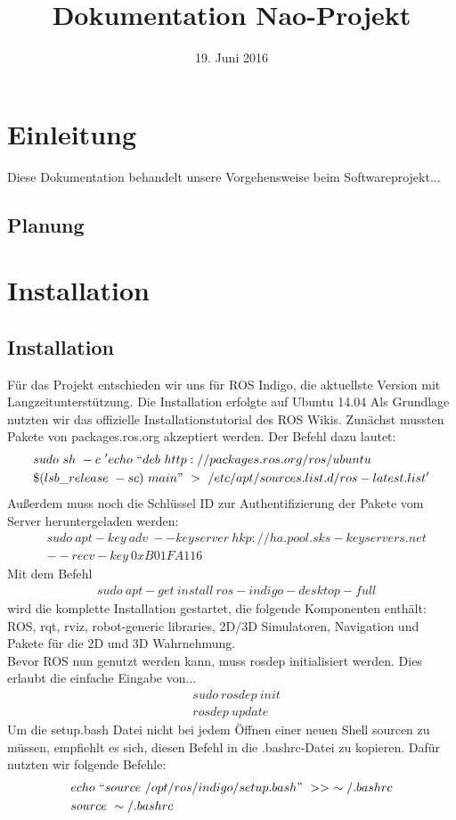 \documentclass{scrartcl}
\title{Dokumentation Nao-Projekt}
\date{19. Juni 2016}
\begin{document}
\maketitle
\tableofcontents
\newpage

\section{Einleitung}

Diese Dokumentation behandelt unsere Vorgehensweise beim Softwareprojekt...

\subsection{Planung}

\section{Installation}


\subsection{Installation}
Für das Projekt entschieden wir uns für ROS Indigo, die aktuellste Version mit Langzeitunterstützung.
Die Installation erfolgte auf Ubuntu 14.04 
Als Grundlage nutzten wir das offizielle Installationstutorial des ROS Wikis.
Zunächst mussten Pakete von packages.ros.org akzeptiert werden. Der Befehl dazu lautet: 
\begin{align}
&sudo\ sh\ -c\ 'echo\ ``deb\ http://packages.ros.org/ros/ubuntu \\ 
&\$(lsb\_release\ -sc)\ main"\ >\ /etc/apt/sources.list.d/ros-latest.list'
\end{align}
Außerdem muss noch die Schlüssel ID  zur Authentifizierung der Pakete vom Server heruntergeladen werden:
\begin{align}
&sudo\ apt-key\ adv\ --keyserver\ hkp://ha.pool.sks-keyservers.net\\ 
& --recv-key\ 0xB01FA116
\end{align}
Mit dem Befehl 
\begin{align}
&sudo\ apt-get\ install\ ros-indigo-desktop-full
\end{align}
wird die komplette Installation gestartet, die folgende Komponenten enthält: ROS, rqt, rviz, robot-generic libraries, 2D/3D Simulatoren, Navigation und Pakete für die 2D und 3D Wahrnehmung.
\\
Bevor ROS nun genutzt werden kann, muss rosdep initialisiert werden. Dies erlaubt die einfache Eingabe von...
\begin{align}
&sudo\ rosdep\ init\\
&rosdep\ update
\end{align}
Um die setup.bash Datei nicht bei jedem Öffnen einer neuen Shell sourcen zu müssen, empfiehlt es sich, diesen Befehl in die .bashrc-Datei zu kopieren.
Dafür nutzten wir folgende Befehle:
\begin{align}
&echo\ ``source\ /opt/ros/indigo/setup.bash"\ >>\ \sim/.bashrc\\
&source\ \sim/.bashrc
\end{align}
\end{document}

